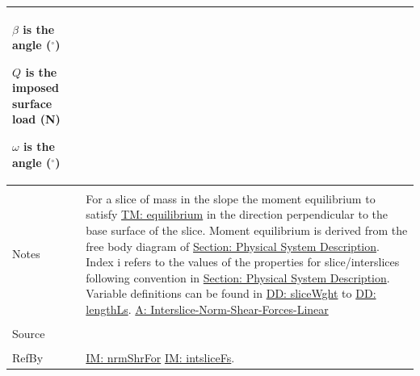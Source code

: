 \documentclass[12pt]{article}
\begin{document}
\begin{minipage}{\textwidth}
\begin{tabular}{p{} p{}}
\begin{symbDescription}
                                 \item{$β$ is the angle (${}^{\circ}$)}
                                 \item{$Q$ is the imposed surface load (N)}
                                 \item{$ω$ is the angle (${}^{\circ}$)}
                                 \end{symbDescription}
                                 \\ \midrule \\
                                 Notes & For a slice of mass in the slope the moment equilibrium to satisfy \hyperref[TM:equilibrium]{TM: equilibrium} in the direction perpendicular to the base surface of the slice. Moment equilibrium is derived from the free body diagram of \hyperref[Sec:PhysSyst]{Section: Physical System Description}. Index i refers to the values of the properties for slice/interslices following convention in \hyperref[Sec:PhysSyst]{Section: Physical System Description}. Variable definitions can be found in \hyperref[DD:sliceWght]{DD: sliceWght} to \hyperref[DD:lengthLs]{DD: lengthLs}. \hyperref[A:Interslice-Norm-Shear-Forces-Linear]{A: Interslice-Norm-Shear-Forces-Linear}
                                         \\ \midrule \\
                                         Source & \cite{chen2005}
                                                  \\ \midrule \\
                                                  RefBy & \hyperref[IM:nrmShrFor]{IM: nrmShrFor} \hyperref[IM:intsliceFs]{IM: intsliceFs}.
\\ \bottomrule \end{tabular}
\end{minipage}\\
\end{document}

